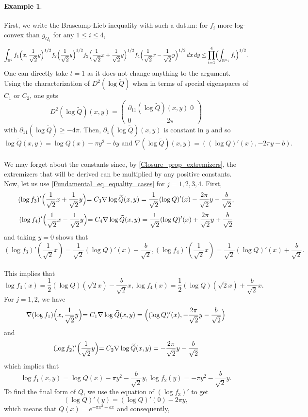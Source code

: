 \documentclass[11pt,a4paper,reqno]{amsart}
\numberwithin{equation}{section}
\theoremstyle{definition}
\newtheorem{example}[theorem]{Example}
\renewcommand{\tilde}{\widetilde}
\newcommand{\<}{\ensuremath \leq}
\renewcommand{\>}{\ensuremath \geq}
\renewcommand{\tilde}{\widetilde}
\begin{document}
\begin{example}
   \hfill \\ \\
   First, we write the Brascamp-Lieb inequality with such a datum: for $f_i$ more log-convex than $g_{Q_i}$ for any $1 \leq i \leq 4$, $$\int_{\mathbb{R}^2}f_1 \Bigl(x,\frac{1}{\sqrt 2}y \Bigl)^{1/2}f_2\Bigl(\frac{1}{\sqrt 2}y \Bigl)^{1/2}f_3 \Bigl(\frac{1}{\sqrt 2}x+\frac{1}{\sqrt 2}y\Bigl)^{1/2}f_4 \Bigl(\frac{1}{\sqrt 2}x-\frac{1}{\sqrt 2}y \Bigl)^{1/2}\, dx \, dy \leq \prod_{i=1}^4 \Bigl( \int_{\mathbb R^{n_i}}f_i\Bigl)^{1/2}.$$ 
   One can directly take $t=1$ as it does not change anything to the argument. Using the characterization of $D^2(\log \tilde Q)$ when in terms of special eigenspaces of $C_1$ or $C_2$, one gets $$D^2(\log \tilde Q)(x,y)=\begin{pmatrix}
       \partial_{11}(\log \tilde Q)(x,y) \; 0 \\
       0 \qquad \qquad -2\pi
   \end{pmatrix}$$ with $\partial_{11}(\log \tilde Q) \geq -4\pi.$ Then, $\partial_1 (\log \tilde Q)(x,y)$ is constant in $y$ and so $$\log \tilde Q(x,y)=\log Q(x)-\pi y^2-by \text{ and } \nabla (\log \tilde Q)(x,y)=((\log Q)'(x),-2\pi y-b).$$
   \hfill \\
   We  may forget about the constants since, by \cref{Closure_prop_extremizers}, the extremizers that will be derived can be multiplied by any positive constants. 
   Now, let us use \cref{Fundamental_eq_equality_cases} for $j=1,2,3,4.$ First, $$(\log f_3)'\Bigl(\frac{1}{\sqrt 2}x+\frac{1}{\sqrt 2}y \Bigl)=C_3\nabla \log \tilde Q(x,y)=\frac{1}{\sqrt 2}(\log Q)'(x)-\frac{2\pi}{\sqrt 2}y-\frac{b}{\sqrt 2},$$ $$(\log f_4)'\Bigl(\frac{1}{\sqrt 2}x-\frac{1}{\sqrt 2}y \Bigl)=C_4\nabla \log \tilde Q(x,y)=\frac{1}{\sqrt 2}(\log Q)'(x)+\frac{2\pi}{\sqrt 2}y+\frac{b}{\sqrt 2}$$ and taking $y=0$ shows that $$(\log f_3)'(\frac{1}{\sqrt 2}x)=\frac{1}{\sqrt 2}(\log Q)'(x)-\frac{b}{\sqrt 2},(\log f_4)'(\frac{1}{\sqrt 2}x)=\frac{1}{\sqrt 2}(\log Q)'(x)+\frac{b}{\sqrt 2}.$$ \hfill \\ This implies that $$\log f_3(x)=\frac{1}{2}(\log Q)(\sqrt 2x)-\frac{b}{\sqrt 2}x ,\log f_4(x)=\frac{1}{2}(\log Q)(\sqrt 2x)+\frac{b}{\sqrt 2}x.$$ For $j=1,2$, we have $$\nabla (\log f_1)\Bigl(x,\frac{1}{\sqrt 2}y \Bigl)=C_1\nabla \log \tilde Q(x,y)=\Bigl((\log Q)'(x),-\frac{2\pi}{\sqrt 2}y-\frac{b}{\sqrt 2}\Bigl)$$ and $$(\log f_2)'\Bigl(\frac{1}{\sqrt 2}y \Bigl)=C_2\nabla \log \tilde Q(x,y)=-\frac{2\pi}{\sqrt 2}y-\frac{b}{\sqrt 2}$$ which implies that $$\log f_1(x,y)=\log Q(x)-\pi y^2-\frac{b}{\sqrt 2}y, \log f_2(y)=-\pi y^2-\frac{b}{\sqrt 2}y.$$  To find the final form of $Q$, we use the equation of $(\log f_3)'$ to get $$(\log Q)'(y)=(\log Q)'(0)-2\pi y,$$ which means that $Q(x)=e^{-\pi x^2-ax}$ and consequently,

\end{example}
\end{document}
